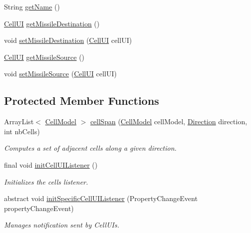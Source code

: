 \begin{DoxyCompactItemize}
\item 
String \hyperlink{classbattleship2D_1_1ui_1_1BoardUI_a2fffd962361295ab5c9b672af9cc8695}{get\-Name} ()
\item 
\hyperlink{classbattleship2D_1_1ui_1_1CellUI}{Cell\-U\-I} \hyperlink{classbattleship2D_1_1ui_1_1BoardUI_a99ba7ffd4aa8f9c5a8707b61119f581d}{get\-Missile\-Destination} ()
\item 
void \hyperlink{classbattleship2D_1_1ui_1_1BoardUI_a245f604b6a6415f40befb26ad01465f5}{set\-Missile\-Destination} (\hyperlink{classbattleship2D_1_1ui_1_1CellUI}{Cell\-U\-I} cell\-U\-I)
\item 
\hyperlink{classbattleship2D_1_1ui_1_1CellUI}{Cell\-U\-I} \hyperlink{classbattleship2D_1_1ui_1_1BoardUI_a4ced3032f0e34050ea3d1a2e1195013d}{get\-Missile\-Source} ()
\item 
void \hyperlink{classbattleship2D_1_1ui_1_1BoardUI_a60ab2df0774770b8cc4623f39c2f39c5}{set\-Missile\-Source} (\hyperlink{classbattleship2D_1_1ui_1_1CellUI}{Cell\-U\-I} cell\-U\-I)
\end{DoxyCompactItemize}
\subsection*{Protected Member Functions}
\begin{DoxyCompactItemize}
\item 
Array\-List$<$ \hyperlink{classbattleship2D_1_1model_1_1CellModel}{Cell\-Model} $>$ \hyperlink{classbattleship2D_1_1ui_1_1BoardUI_a33e7e92812292c5f12120527dca6235a}{cell\-Span} (\hyperlink{classbattleship2D_1_1model_1_1CellModel}{Cell\-Model} cell\-Model, \hyperlink{enumbattleship2D_1_1model_1_1Direction}{Direction} direction, int nb\-Cells)
\begin{DoxyCompactList}\small\item\em Computes a set of adjacent cells along a given direction. \end{DoxyCompactList}\item 
final void \hyperlink{classbattleship2D_1_1ui_1_1BoardUI_af5065de9a559f9380fc454d8925475a9}{init\-Cell\-U\-I\-Listener} ()
\begin{DoxyCompactList}\small\item\em Initializes the cells listener. \end{DoxyCompactList}\item 
abstract void \hyperlink{classbattleship2D_1_1ui_1_1BoardUI_a7e3ea738a19683ac7ac9cb247d519a1f}{init\-Specific\-Cell\-U\-I\-Listener} (Property\-Change\-Event property\-Change\-Event)
\begin{DoxyCompactList}\small\item\em Manages notification sent by Cell\-U\-Is. \end{DoxyCompactList}\end{DoxyCompactItemize}
